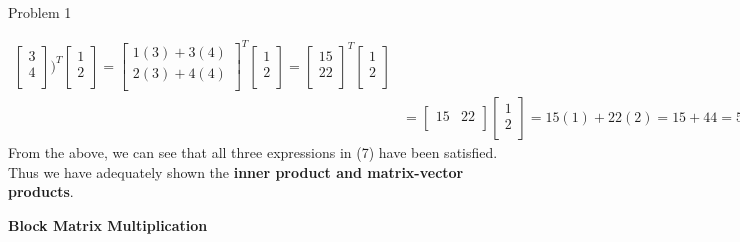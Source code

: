 \begin{problem}{Problem 1}
\begin{Highlight}[Solution]
\begin{align*}
                \begin{bmatrix}
                    3 \\
                    4 \\
                \end{bmatrix}
            \Biggr)^{T}
            \begin{bmatrix}
                1 \\
                2 \\
            \end{bmatrix}
            = 
            \begin{bmatrix}
                1(3) + 3(4) \\
                2(3) + 4(4) \\
            \end{bmatrix}^{T}
            \begin{bmatrix}
                1 \\
                2 \\
            \end{bmatrix}
            = 
            \begin{bmatrix}
                15 \\
                22 \\
            \end{bmatrix}^{T}
            \begin{bmatrix}
                1 \\
                2 \\
            \end{bmatrix} \\
            & = 
            \begin{bmatrix}
                15 & 22 \\
            \end{bmatrix}
            \begin{bmatrix}
                1 \\
                2 \\
            \end{bmatrix}
            = 
            15(1) + 22(2) = 15 + 44 = 59.
        \end{align*}
        From the above, we can see that all three expressions in (7) have been satisfied. Thus we have adequately shown the \textbf{inner product and matrix-vector products}. \vspace*{1em}

        \noindent \textbf{Block Matrix Multiplication} \vspace*{1em}


\end{Highlight}
\end{problem}
